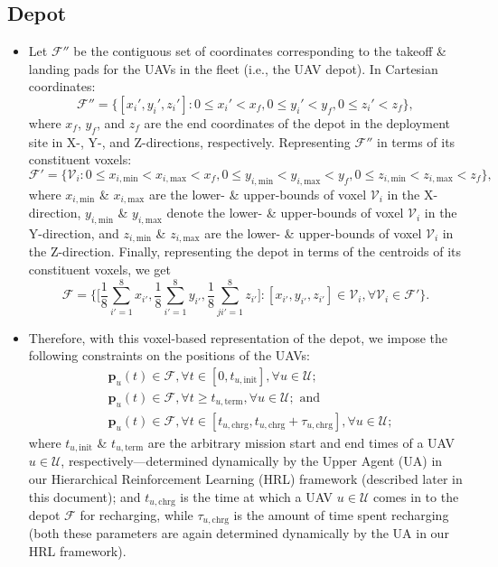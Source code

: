 \documentclass{article}
\begin{document}
\subsection{Depot}
\begin{itemize}
    \item Let $\mathcal{F}''$ be the contiguous set of coordinates corresponding to the takeoff \& landing pads for the UAVs in the fleet (i.e., the UAV depot). In Cartesian coordinates:
    $$\mathcal{F}''{=}\{[x_{i}',y_{i}',z_{i}']:0{\leq}x_{i}'{<}x_{f},0{\leq}y_{i}'{<}y_{f},0{\leq}z_{i}'{<}z_{f}\},$$
    where $x_{f}$, $y_{f}$, and $z_{f}$ are the end coordinates of the depot in the deployment site in X-, Y-, and Z-directions, respectively. Representing $\mathcal{F}''$ in terms of its constituent voxels:
    $$\mathcal{F}'{=}\{\mathcal{V}_{i}:0{\leq}x_{i,\mathrm{min}}{<}x_{i,\mathrm{max}}{<}x_{f},0{\leq}y_{i,\mathrm{min}}{<}y_{i,\mathrm{max}}{<}y_{f},0{\leq}z_{i,\mathrm{min}}{<}z_{i,\mathrm{max}}{<}z_{f}\},$$
    where $x_{i,\mathrm{min}}$ \& $x_{i,\mathrm{max}}$ are the lower- \& upper-bounds of voxel $\mathcal{V}_{i}$ in the X-direction, $y_{i,\mathrm{min}}$ \& $y_{i,\mathrm{max}}$ denote the lower- \& upper-bounds of voxel $\mathcal{V}_{i}$ in the Y-direction, and $z_{i,\mathrm{min}}$ \& $z_{i,\mathrm{max}}$ are the lower- \& upper-bounds of voxel $\mathcal{V}_{i}$ in the Z-direction. Finally, representing the depot in terms of the centroids of its constituent voxels, we get
    $$\mathcal{F}{=}\Bigg\{\Bigg[\frac{1}{8}\sum_{i'{=}1}^{8}x_{i'},\frac{1}{8}\sum_{i'{=}1}^{8}y_{i'},\frac{1}{8}\sum_{ji'{=}1}^{8}z_{i'}\Bigg]:[x_{i'},y_{i'},z_{i'}]{\in}\mathcal{V}_{i},{\forall}\mathcal{V}_{i}{\in}\mathcal{F}'\Bigg\}.$$
    \item Therefore, with this voxel-based representation of the depot, we impose the following constraints on the positions of the UAVs:
    \begin{align*}
        &\mathbf{p}_{u}(t){\in}\mathcal{F},{\forall}t{\in}[0,t_{u,\mathrm{init}}],{\forall}u{\in}\mathcal{U};\\
        &\mathbf{p}_{u}(t){\in}\mathcal{F},{\forall}t{\geq}t_{u,\mathrm{term}},{\forall}u{\in}\mathcal{U};\text{ and}\\
        &\mathbf{p}_{u}(t){\in}\mathcal{F},{\forall}t{\in}[t_{u,\mathrm{chrg}},t_{u,\mathrm{chrg}}{+}\tau_{u,\mathrm{chrg}}],{\forall}u{\in}\mathcal{U};
    \end{align*}
    where $t_{u,\mathrm{init}}$ \& $t_{u,\mathrm{term}}$ are the arbitrary mission start and end times of a UAV $u{\in}\mathcal{U}$, respectively---determined dynamically by the Upper Agent (UA) in our Hierarchical Reinforcement Learning (HRL) framework (described later in this document); and $t_{u,\mathrm{chrg}}$ is the time at which a UAV $u{\in}\mathcal{U}$ comes in to the depot $\mathcal{F}$ for recharging, while $\tau_{u,\mathrm{chrg}}$ is the amount of time spent recharging (both these parameters are again determined dynamically by the UA in our HRL framework).
\end{itemize}
\end{document}
